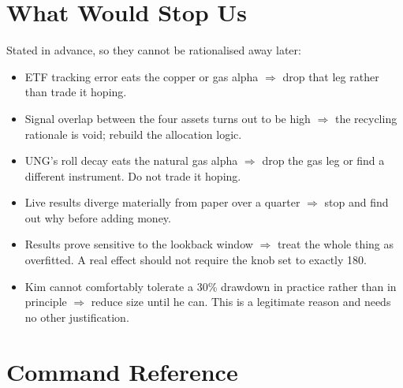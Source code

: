 \documentclass[11pt,a4paper]{article}
\begin{document}
\section{What Would Stop Us}

Stated in advance, so they cannot be rationalised away later:

\begin{itemize}[leftmargin=2em]
    \item ETF tracking error eats the copper or gas alpha
          $\Rightarrow$ drop that leg rather than trade it hoping.
    \item Signal overlap between the four assets turns out to be high
          $\Rightarrow$ the recycling rationale is void; rebuild the
          allocation logic.
    \item UNG's roll decay eats the natural gas alpha $\Rightarrow$ drop
          the gas leg or find a different instrument. Do not trade it
          hoping.
    \item Live results diverge materially from paper over a quarter
          $\Rightarrow$ stop and find out why before adding money.
    \item Results prove sensitive to the lookback window $\Rightarrow$
          treat the whole thing as overfitted. A real effect should not
          require the knob set to exactly 180.
    \item Kim cannot comfortably tolerate a 30\% drawdown in practice
          rather than in principle $\Rightarrow$ reduce size until he
          can. This is a legitimate reason and needs no other
          justification.
\end{itemize}

\section{Command Reference}
\label{sec:manifest}
\end{document}
